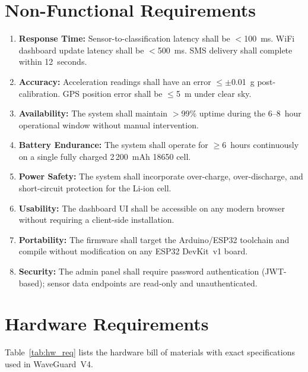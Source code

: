 \section{Non-Functional Requirements}

\begin{enumerate}[label=NF-\arabic*.]
  \item \textbf{Response Time:} Sensor-to-classification latency shall be
        $<$100~ms. WiFi dashboard update latency shall be $<$500~ms. SMS
        delivery shall complete within 12~seconds.
  \item \textbf{Accuracy:} Acceleration readings shall have an error $\leq\pm$0.01~g
        post-calibration. GPS position error shall be $\leq$5~m under clear sky.
  \item \textbf{Availability:} The system shall maintain $>$99\% uptime during the
        6--8~hour operational window without manual intervention.
  \item \textbf{Battery Endurance:} The system shall operate for $\geq$6~hours
        continuously on a single fully charged 2\,200~mAh 18650 cell.
  \item \textbf{Power Safety:} The system shall incorporate over-charge, over-discharge,
        and short-circuit protection for the Li-ion cell.
  \item \textbf{Usability:} The dashboard UI shall be accessible on any modern browser
        without requiring a client-side installation.
  \item \textbf{Portability:} The firmware shall target the Arduino/ESP32 toolchain
        and compile without modification on any ESP32 DevKit~v1 board.
  \item \textbf{Security:} The admin panel shall require password authentication
        (JWT-based); sensor data endpoints are read-only and unauthenticated.
\end{enumerate}

\section{Hardware Requirements}

Table~\ref{tab:hw_req} lists the hardware bill of materials with exact specifications
used in WaveGuard~V4.

